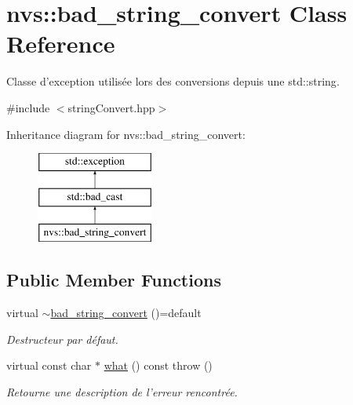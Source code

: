 \hypertarget{classnvs_1_1bad__string__convert}{\section{nvs\+:\+:bad\+\_\+string\+\_\+convert Class Reference}
\label{classnvs_1_1bad__string__convert}
}


Classe d'exception utilisée lors des conversions depuis une {\ttfamily std\+::string}.  




{\ttfamily \#include $<$string\+Convert.\+hpp$>$}

Inheritance diagram for nvs\+:\+:bad\+\_\+string\+\_\+convert\+:\begin{figure}[H]
\begin{center}
\leavevmode
\includegraphics[height=3.000000cm]{classnvs_1_1bad__string__convert}
\end{center}
\end{figure}
\subsection*{Public Member Functions}
\begin{DoxyCompactItemize}
\item 
\hypertarget{classnvs_1_1bad__string__convert_a350e4edfec1e675896be8e1e303b4706}{virtual \hyperlink{classnvs_1_1bad__string__convert_a350e4edfec1e675896be8e1e303b4706}{$\sim$bad\+\_\+string\+\_\+convert} ()=default}\label{classnvs_1_1bad__string__convert_a350e4edfec1e675896be8e1e303b4706}

\begin{DoxyCompactList}\small\item\em Destructeur par défaut. \end{DoxyCompactList}\item 
virtual const char $\ast$ \hyperlink{classnvs_1_1bad__string__convert_a086b280c9feeae9b0548665da4abaee8}{what} () const   throw ()
\begin{DoxyCompactList}\small\item\em Retourne une description de l'erreur rencontrée. \end{DoxyCompactList}\end{DoxyCompactItemize}


